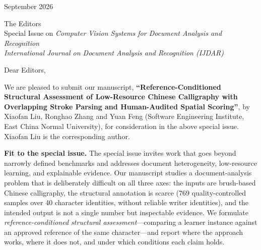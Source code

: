 \documentclass[11pt,a4paper]{article}
\begin{document}
 September 2026

\medskip
\noindent
The Editors\\
Special Issue on \emph{Computer Vision Systems for Document Analysis and
Recognition}\\
\emph{International Journal on Document Analysis and Recognition (IJDAR)}

\medskip
\noindent
Dear Editors,

\noindent
We are pleased to submit our manuscript, \textbf{``Reference-Conditioned
Structural Assessment of Low-Resource Chinese Calligraphy with Overlapping
Stroke Parsing and Human-Audited Spatial Scoring''}, by Xiaofan Liu, Ronghao
Zhang and Yuan Feng (Software Engineering Institute, East China Normal
University), for consideration in the above special issue. Xiaofan Liu is the
corresponding author.

\textbf{Fit to the special issue.} The special issue invites work that goes
beyond narrowly defined benchmarks and addresses document heterogeneity,
low-resource learning, and explainable evidence. Our manuscript studies a
document-analysis problem that is deliberately difficult on all three axes:
the inputs are brush-based Chinese calligraphy, the structural annotation is
scarce (769 quality-controlled samples over 40 character identities, without
reliable writer identities), and the intended output is not a single number
but inspectable evidence. We formulate
\emph{reference-conditioned structural assessment}---comparing a learner
instance against an approved reference of the same character---and report
where the approach works, where it does not, and under which conditions each
claim holds.
\end{document}
